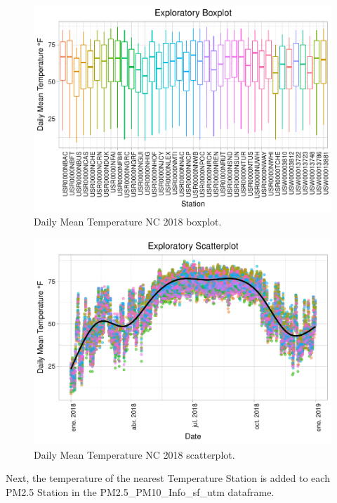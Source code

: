 \documentclass[12pt,]{article}
\begin{document}
\begin{figure}
\centering
\includegraphics{./Outputunnamed-chunk-31-1.pdf}
\caption{Daily Mean Temperature NC 2018 boxplot. \label{Temp_boxplot}}
\end{figure}

\begin{figure}
\centering
\includegraphics{./Outputunnamed-chunk-32-1.pdf}
\caption{Daily Mean Temperature NC 2018 scatterplot.
\label{Temp_scatterplot}}
\end{figure}

Next, the temperature of the nearest Temperature Station is added to
each PM2.5 Station in the PM2.5\_PM10\_Info\_sf\_utm dataframe.
\end{document}
